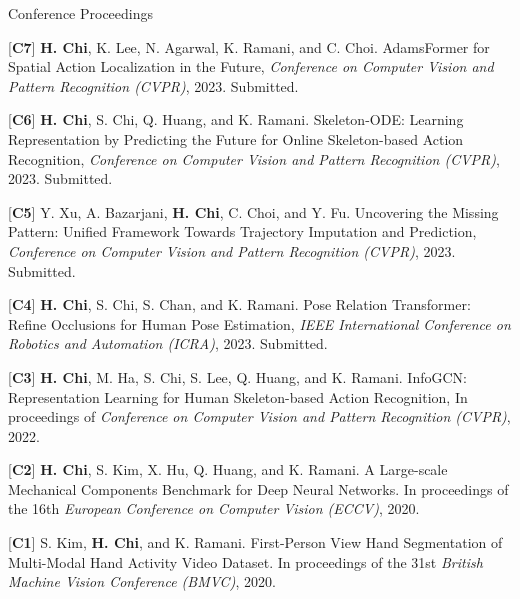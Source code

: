 


\begin{cventries}
\cvpub
{Conference Proceedings} %
{ %
\begin{cvitems}
\item {[\textbf{C7}] \textbf{H. Chi}, K. Lee, N. Agarwal, K. Ramani, and C. Choi. AdamsFormer for Spatial Action Localization in the Future, \textit{Conference on Computer Vision and Pattern Recognition (CVPR)}, 2023. Submitted.}
\item {[\textbf{C6}] \textbf{H. Chi}, S. Chi, Q. Huang, and K. Ramani. Skeleton-ODE: Learning Representation by Predicting the Future for Online Skeleton-based Action Recognition, \textit{Conference on Computer Vision and Pattern Recognition (CVPR)}, 2023. Submitted.}
\item {[\textbf{C5}] Y. Xu, A. Bazarjani, \textbf{H. Chi}, C. Choi, and Y. Fu. Uncovering the Missing Pattern: Unified Framework Towards Trajectory Imputation and Prediction, \textit{Conference on Computer Vision and Pattern Recognition (CVPR)}, 2023. Submitted.}
\item {[\textbf{C4}] \textbf{H. Chi}, S. Chi, S. Chan, and K. Ramani. Pose Relation Transformer: Refine Occlusions for Human Pose Estimation, \textit{IEEE International Conference on Robotics and Automation (ICRA)}, 2023. Submitted.}
\item {[\textbf{C3}] \textbf{H. Chi}, M. Ha, S. Chi, S. Lee, Q. Huang, and K. Ramani. InfoGCN: Representation Learning for Human Skeleton-based Action Recognition, In proceedings of \textit{Conference on Computer Vision and Pattern Recognition (CVPR)}, 2022.}
\item {[\textbf{C2}] \textbf{H. Chi}, S. Kim, X. Hu, Q. Huang, and K. Ramani. A Large-scale Mechanical Components Benchmark for Deep Neural Networks. In proceedings of the 16th \textit{European Conference on Computer Vision (ECCV)}, 2020.}
\item {[\textbf{C1}] S. Kim, \textbf{H. Chi}, and K. Ramani. First-Person View Hand Segmentation of Multi-Modal Hand Activity Video Dataset. In proceedings of the 31st \textit{British Machine Vision Conference (BMVC)}, 2020.}
\end{cvitems}
}


\end{cventries}
